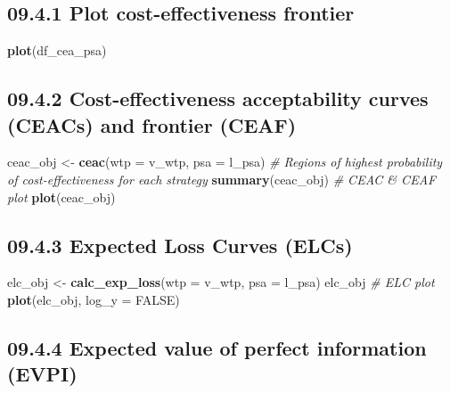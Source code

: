 \documentclass[
]{article}
\newenvironment{Shaded}{\begin{snugshade}}{\end{snugshade}}
\newcommand{\CommentTok}[1]{\textcolor[rgb]{0.56,0.35,0.01}{\textit{#1}}}
\newcommand{\DataTypeTok}[1]{\textcolor[rgb]{0.13,0.29,0.53}{#1}}
\newcommand{\KeywordTok}[1]{\textcolor[rgb]{0.13,0.29,0.53}{\textbf{#1}}}
\newcommand{\NormalTok}[1]{#1}
\newcommand{\OtherTok}[1]{\textcolor[rgb]{0.56,0.35,0.01}{#1}}
\newcommand{\StringTok}[1]{\textcolor[rgb]{0.31,0.60,0.02}{#1}}
\begin{document}
\hypertarget{plot-cost-effectiveness-frontier}{%
\subsection{09.4.1 Plot cost-effectiveness
frontier}\label{plot-cost-effectiveness-frontier}}

\begin{Shaded}
\begin{Highlighting}[]
\KeywordTok{plot}\NormalTok{(df_cea_psa)}
\end{Highlighting}
\end{Shaded}

\hypertarget{cost-effectiveness-acceptability-curves-ceacs-and-frontier-ceaf}{%
\subsection{09.4.2 Cost-effectiveness acceptability curves (CEACs) and
frontier
(CEAF)}\label{cost-effectiveness-acceptability-curves-ceacs-and-frontier-ceaf}}

\begin{Shaded}
\begin{Highlighting}[]
\NormalTok{ceac_obj <-}\StringTok{ }\KeywordTok{ceac}\NormalTok{(}\DataTypeTok{wtp =}\NormalTok{ v_wtp, }\DataTypeTok{psa =}\NormalTok{ l_psa)}
\CommentTok{# Regions of highest probability of cost-effectiveness for each strategy}
\KeywordTok{summary}\NormalTok{(ceac_obj)}
\CommentTok{# CEAC & CEAF plot}
\KeywordTok{plot}\NormalTok{(ceac_obj)}
\end{Highlighting}
\end{Shaded}

\hypertarget{expected-loss-curves-elcs}{%
\subsection{09.4.3 Expected Loss Curves
(ELCs)}\label{expected-loss-curves-elcs}}

\begin{Shaded}
\begin{Highlighting}[]
\NormalTok{elc_obj <-}\StringTok{ }\KeywordTok{calc_exp_loss}\NormalTok{(}\DataTypeTok{wtp =}\NormalTok{ v_wtp, }\DataTypeTok{psa =}\NormalTok{ l_psa)}
\NormalTok{elc_obj}
\CommentTok{# ELC plot}
\KeywordTok{plot}\NormalTok{(elc_obj, }\DataTypeTok{log_y =} \OtherTok{FALSE}\NormalTok{)}
\end{Highlighting}
\end{Shaded}

\hypertarget{expected-value-of-perfect-information-evpi}{%
\subsection{09.4.4 Expected value of perfect information
(EVPI)}\label{expected-value-of-perfect-information-evpi}}
\end{document}
